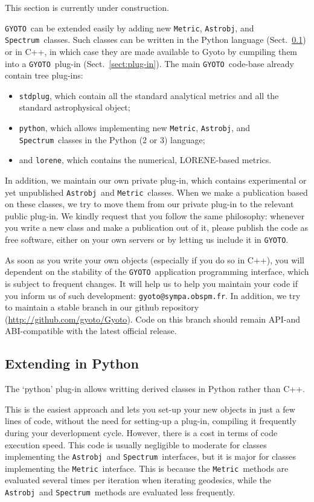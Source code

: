 \documentclass[a4paper,12pt]{article}
\newcommand{\GYOTO}{\texttt{GYOTO}}
\newcommand{\Metric}{\texttt{Metric}}
\newcommand{\Astrobj}{\texttt{Astrobj}}
\newcommand{\Spectrum}{\texttt{Spectrum}}
\begin{document}
This section is currently under construction.

\GYOTO\ can be extended easily by adding new \Metric, \Astrobj, and
\Spectrum\ classes. Such classes can be written in the Python language
(Sect.~\ref{sect:python-plug-in}) or in C++, in which case they are made
available to Gyoto by cumpiling them into a \GYOTO\ plug-in
(Sect.~\ref{sect:plug-in}). The main \GYOTO\ code-base already contain
tree plug-ins:
\begin{itemize}
\item \texttt{stdplug}, which contain all the standard analytical
  metrics and all the standard astrophysical object;
\item \texttt{python}, which allows implementing new \Metric,
  \Astrobj, and \Spectrum\ classes in the Python (2 or 3) language;
\item and \texttt{lorene}, which contains the numerical, LORENE-based
  metrics.
\end{itemize}
In addition, we maintain our own private plug-in, which contains
experimental or yet unpublished \Astrobj\ and \Metric\ classes. When
we make a publication based on these classes, we try to move them from
our private plug-in to the relevant public plug-in. We kindly request
that you follow the same philosophy: whenever you write a new class
and make a publication out of it, please publish the code as free
software, either on your own servers or by letting us include it in
\GYOTO.

As soon as you write your own objects (especially if you do so in
C++), you will dependent on the stability of the \GYOTO\ application
programming interface, which is subject to frequent changes. It will
help us to help you maintain your code if you inform us of such
development: \texttt{gyoto@sympa.obspm.fr}. In addition, we try to
maintain a stable branch in our github repository
(\url{http://github.com/gyoto/Gyoto}). Code on this branch should
remain API-and ABI-compatible with the latest official release.

\subsection{Extending in Python}
\label{sect:python-plug-in}
The `python' plug-in allows writting derived classes
in Python rather than C++.

This is the easiest approach and lets you set-up your new
objects in just a few lines of code, without the need for setting-up a
plug-in, compiling it frequently during your deverlopment
cycle. However, there is a cost in terms of code execution speed. This
code is usually negligible to moderate for classes implementing the
\Astrobj\ and \Spectrum\ interfaces, but it is major for classes
implementing the \Metric\ interface. This is because the \Metric\
methods are evaluated several times per iteration when iterating
geodesics, while the \Astrobj\ and \Spectrum\ methods are evaluated
less frequently.
\end{document}
